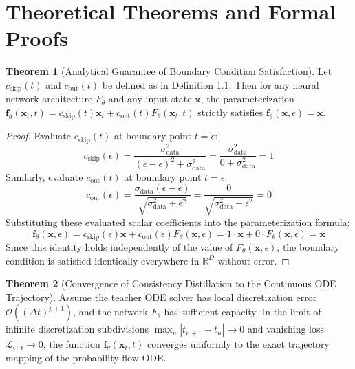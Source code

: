 \documentclass[11pt,a4paper]{article}
\theoremstyle{definition}
\newtheorem{theorem}{\textbf{Theorem}}[section]
\begin{document}
\section{Theoretical Theorems and Formal Proofs}

\begin{theorem}[Analytical Guarantee of Boundary Condition Satisfaction]
Let $c_{\text{skip}}(t)$ and $c_{\text{out}}(t)$ be defined as in Definition 1.1. Then for any neural network architecture $F_\theta$ and any input state $\mathbf{x}$, the parameterization $\mathbf{f}_\theta(\mathbf{x}_t, t) = c_{\text{skip}}(t)\mathbf{x}_t + c_{\text{out}}(t)F_\theta(\mathbf{x}_t, t)$ strictly satisfies $\mathbf{f}_\theta(\mathbf{x}, \epsilon) = \mathbf{x}$.
\end{theorem}

\begin{proof}
Evaluate $c_{\text{skip}}(t)$ at boundary point $t = \epsilon$:
{\boldmath
\begin{equation}
c_{\text{skip}}(\epsilon) = \frac{\sigma_{\text{data}}^2}{(\epsilon - \epsilon)^2 + \sigma_{\text{data}}^2} = \frac{\sigma_{\text{data}}^2}{0 + \sigma_{\text{data}}^2} = 1
\end{equation}
}
Similarly, evaluate $c_{\text{out}}(t)$ at boundary point $t = \epsilon$:
{\boldmath
\begin{equation}
c_{\text{out}}(\epsilon) = \frac{\sigma_{\text{data}}(\epsilon - \epsilon)}{\sqrt{\sigma_{\text{data}}^2 + \epsilon^2}} = \frac{0}{\sqrt{\sigma_{\text{data}}^2 + \epsilon^2}} = 0
\end{equation}
}
Substituting these evaluated scalar coefficients into the parameterization formula:
{\boldmath
\begin{equation}
\mathbf{f}_\theta(\mathbf{x}, \epsilon) = c_{\text{skip}}(\epsilon)\mathbf{x} + c_{\text{out}}(\epsilon) F_\theta(\mathbf{x}, \epsilon) = 1 \cdot \mathbf{x} + 0 \cdot F_\theta(\mathbf{x}, \epsilon) = \mathbf{x}
\end{equation}
}
Since this identity holds independently of the value of $F_\theta(\mathbf{x}, \epsilon)$, the boundary condition is satisfied identically everywhere in $\mathbb{R}^D$ without error.
\end{proof}

\begin{theorem}[Convergence of Consistency Distillation to the Continuous ODE Trajectory]
Assume the teacher ODE solver has local discretization error $\mathcal{O}((\Delta t)^{p+1})$, and the network $F_\theta$ has sufficient capacity. In the limit of infinite discretization subdivisions $\max_n |t_{n+1} - t_n| \to 0$ and vanishing loss $\mathcal{L}_{\text{CD}} \to 0$, the function $\mathbf{f}_\theta(\mathbf{x}_t, t)$ converges uniformly to the exact trajectory mapping of the probability flow ODE.
\end{theorem}
\end{document}
